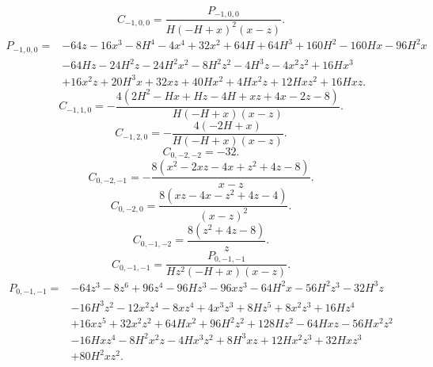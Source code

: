 \begin{equation}
C_{-1,0,0}=\frac{P_{-1,0,0}}{H \left(- H + x\right)^{2} \left(x - z\right)}.
\end{equation}
\begin{equation}
\begin{aligned}
P_{-1,0,0}={}& - 64 z - 16 x^{3} - 8 H^{4} - 4 x^{4} + 32 x^{2} + 64 H + 64 H^{3} + 160 H^{2} - 160 H x - 96 H^{2} x\\
& - 64 H z - 24 H^{2} z - 24 H^{2} x^{2} - 8 H^{2} z^{2} - 4 H^{3} z - 4 x^{2} z^{2} + 16 H x^{3}\\
& + 16 x^{2} z + 20 H^{3} x + 32 x z + 40 H x^{2} + 4 H x^{2} z + 12 H x z^{2} + 16 H x z.
\end{aligned}
\end{equation}
\begin{equation}
C_{-1,1,0}=- \frac{4 \left(2 H^{2} - H x + H z - 4 H + x z + 4 x - 2 z - 8\right)}{H \left(- H + x\right) \left(x - z\right)}.
\end{equation}
\begin{equation}
C_{-1,2,0}=- \frac{4 \left(- 2 H + x\right)}{H \left(- H + x\right) \left(x - z\right)}.
\end{equation}
\begin{equation}
C_{0,-2,-2}=-32.
\end{equation}
\begin{equation}
C_{0,-2,-1}=- \frac{8 \left(x^{2} - 2 x z - 4 x + z^{2} + 4 z - 8\right)}{x - z}.
\end{equation}
\begin{equation}
C_{0,-2,0}=\frac{8 \left(x z - 4 x - z^{2} + 4 z - 4\right)}{\left(x - z\right)^{2}}.
\end{equation}
\begin{equation}
C_{0,-1,-2}=\frac{8 \left(z^{2} + 4 z - 8\right)}{z}.
\end{equation}
\begin{equation}
C_{0,-1,-1}=\frac{P_{0,-1,-1}}{H z^{2} \left(- H + x\right) \left(x - z\right)}.
\end{equation}
\begin{equation}
\begin{aligned}
P_{0,-1,-1}={}& - 64 z^{3} - 8 z^{6} + 96 z^{4} - 96 H z^{3} - 96 x z^{3} - 64 H^{2} x - 56 H^{2} z^{3} - 32 H^{3} z\\
& - 16 H^{3} z^{2} - 12 x^{2} z^{4} - 8 x z^{4} + 4 x^{3} z^{3} + 8 H z^{5} + 8 x^{2} z^{3} + 16 H z^{4}\\
& + 16 x z^{5} + 32 x^{2} z^{2} + 64 H x^{2} + 96 H^{2} z^{2} + 128 H z^{2} - 64 H x z - 56 H x^{2} z^{2}\\
& - 16 H x z^{4} - 8 H^{2} x^{2} z - 4 H x^{3} z^{2} + 8 H^{3} x z + 12 H x^{2} z^{3} + 32 H x z^{3}\\
& + 80 H^{2} x z^{2}.
\end{aligned}
\end{equation}
